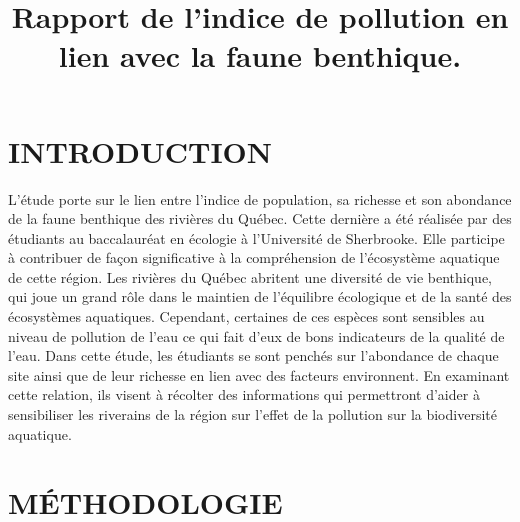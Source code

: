 \documentclass[]{glossa}
\title[A subtitle goes on another line]{Rapport de l'indice de pollution
en lien avec la faune benthique.}
\author[Paul \& Vanden Wyngaerd]{
    \spauthor{Claudiane Bondu\\
  \institute{}\\
  \small{}
  }%
  \AND  \spauthor{Antoine Castonguay\\
  \institute{}\\
  \small{}
  }%
  \AND  \spauthor{Juliette Robin\\
  \institute{}\\
  \small{}
  }%
  }
\begin{document}
\sffamily
\maketitle



\rmfamily

\hypertarget{introduction}{%
\section{INTRODUCTION}\label{introduction}}

L'étude porte sur le lien entre l'indice de population, sa richesse et
son abondance de la faune benthique des rivières du Québec. Cette
dernière a été réalisée par des étudiants au baccalauréat en écologie à
l'Université de Sherbrooke. Elle participe à contribuer de façon
significative à la compréhension de l'écosystème aquatique de cette
région. Les rivières du Québec abritent une diversité de vie benthique,
qui joue un grand rôle dans le maintien de l'équilibre écologique et de
la santé des écosystèmes aquatiques. Cependant, certaines de ces espèces
sont sensibles au niveau de pollution de l'eau ce qui fait d'eux de bons
indicateurs de la qualité de l'eau. Dans cette étude, les étudiants se
sont penchés sur l'abondance de chaque site ainsi que de leur richesse
en lien avec des facteurs environnent. En examinant cette relation, ils
visent à récolter des informations qui permettront d'aider à
sensibiliser les riverains de la région sur l'effet de la pollution sur
la biodiversité aquatique.

\hypertarget{muxe9thodologie}{%
\section{MÉTHODOLOGIE}\label{muxe9thodologie}}
\end{document}
